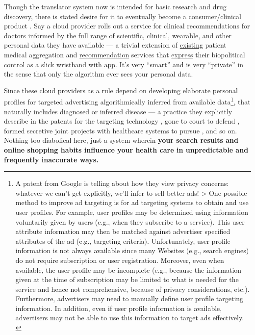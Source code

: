 \documentclass[10pt]{article}
\begin{document}
\begin{multicols}{2}
Though the translator system now is intended for basic research and drug
discovery, there is stated desire for it to eventually become a
consumer/clinical product \cite{hailuNIHfundedProjectAims2019} .
Say a cloud provider rolls out a service for clinical recommendations
for doctors informed by the full range of scientific, clinical,
wearable, and other personal data they have available --- a trivial
extension of
\href{https://web.archive.org/web/20211003070018/https://support.apple.com/en-us/HT208680}{existing}
patient medical aggregation and
\href{https://web.archive.org/web/20210408221213/https://support.google.com/fit/answer/7619539?hl=en\&co=GENIE.Platform\%3DAndroid}{recommendation}
services that
\href{https://web.archive.org/web/20210930203834/https://press.aboutamazon.com/news-releases/news-release-details/amazon-adds-more-halo-introducing-halo-view-halo-fitness-and}{express}
their biopolitical control as a slick wristband with app. It's very
``smart'' and is very ``private'' in the sense that only the algorithm
ever sees your personal data.

Since these cloud providers as a rule depend on developing elaborate
personal profiles for targeted advertising algorithmically inferred from
available data\footnote{A patent from Google is telling about how they
  view privacy concerns: whatever we can't get explicitly, we'll infer
  to sell better ads! \textgreater{} One possible method to improve ad
  targeting is for ad targeting systems to obtain and use user profiles.
  For example, user profiles may be determined using information
  voluntarily given by users (e.g., when they subscribe to a service).
  This user attribute information may then be matched against advertiser
  specified attributes of the ad (e.g., targeting criteria).
  Unfortunately, user profile information is not always available since
  many Websites (e.g., search engines) do not require subscription or
  user registration. Moreover, even when available, the user profile may
  be incomplete (e.g., because the information given at the time of
  subscription may be limited to what is needed for the service and
  hence not comprehensive, because of privacy considerations, etc.).
  Furthermore, advertisers may need to manually define user profile
  targeting information. In addition, even if user profile information
  is available, advertisers may not be able to use this information to
  target ads effectively. \cite{bharatGeneratingUserInformation2005} }, that naturally includes diagnosed or inferred disease --- a
practice they explicitly describe in the patents for the targeting
technology\cite{bharatGeneratingUserInformation2005} , gone to
court to defend \cite{SmithFacebookInc2018, krashinskyGoogleBrokeCanada2014} , formed secretive joint projects
with healthcare systems to pursue \cite{bourreauGoogleFitbitWill2020} , and so on. Nothing too diabolical here, just a system wherein
\textbf{your search results and online shopping habits influence your
health care in unpredictable and frequently inaccurate \cite{rasmyMedBERTPretrainedContextualized2021}  ways.}


\end{multicols}
\end{document}
